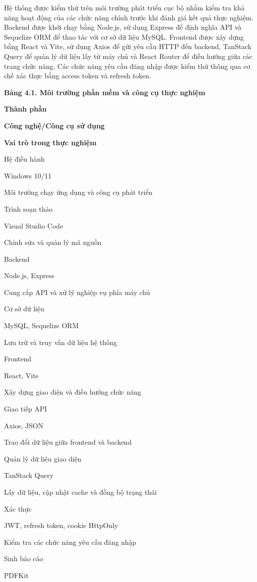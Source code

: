 Hệ thống được kiểm thử trên môi trường phát triển cục bộ nhằm kiểm tra khả năng hoạt động của các chức năng chính trước khi đánh giá kết quả thực nghiệm. Backend được khởi chạy bằng Node.js, sử dụng Express để định nghĩa API và Sequelize ORM để thao tác với cơ sở dữ liệu MySQL. Frontend được xây dựng bằng React và Vite, sử dụng Axios để gửi yêu cầu HTTP đến backend, TanStack Query để quản lý dữ liệu lấy từ máy chủ và React Router để điều hướng giữa các trang chức năng. Các chức năng yêu cầu đăng nhập được kiểm thử thông qua cơ chế xác thực bằng access token và refresh token.

\textbf{Bảng 4.1. Môi trường phần mềm và công cụ thực nghiệm}

\textbf{Thành phần}

\textbf{Công nghệ/Công cụ sử dụng}

\textbf{Vai trò trong thực nghiệm}

Hệ điều hành

Windows 10/11

Môi trường chạy ứng dụng và công cụ phát triển

Trình soạn thảo

Visual Studio Code

Chỉnh sửa và quản lý mã nguồn

Backend

Node.js, Express

Cung cấp API và xử lý nghiệp vụ phía máy chủ

Cơ sở dữ liệu

MySQL, Sequelize ORM

Lưu trữ và truy vấn dữ liệu hệ thống

Frontend

React, Vite

Xây dựng giao diện và điều hướng chức năng

Giao tiếp API

Axios, JSON

Trao đổi dữ liệu giữa frontend và backend

Quản lý dữ liệu giao diện

TanStack Query

Lấy dữ liệu, cập nhật cache và đồng bộ trạng thái

Xác thực

JWT, refresh token, cookie HttpOnly

Kiểm tra các chức năng yêu cầu đăng nhập

Sinh báo cáo

PDFKit

